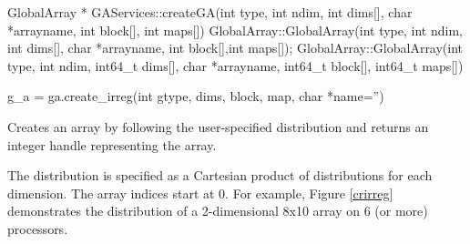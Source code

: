 \documentclass[12pt]{article}
\begin{document}
\begin{cxxapi}
\begin{cxxcode}
GlobalArray * GAServices::createGA(int type, int ndim, int dims[],
                                   char *arrayname,
                                   int block[], int maps[])
GlobalArray::GlobalArray(int type, int ndim, int dims[], char *arrayname,
                         int block[],int maps[]);
GlobalArray::GlobalArray(int type, int ndim, int64_t dims[],
                         char *arrayname, int64_t block[],
                         int64_t maps[])
\end{cxxcode}
\begin{funcargs}
\end{funcargs}
\end{cxxapi}

\begin{pyapi}
\begin{pycode}
g_a = ga.create_irreg(int gtype, dims, block, map, char *name='')
\end{pycode}
\begin{funcargs}
\end{funcargs}
\end{pyapi}

\dcoll

\begin{desc}

Creates an array by following the user-specified distribution and returns an
integer handle representing the array.

The distribution is specified as a Cartesian product of distributions for each
dimension. The array indices start at 0.  For example, Figure \ref{crirreg}
demonstrates the distribution of a 2-dimensional 8x10 array on 6 (or more)
processors.
\end{desc}
\end{document}
